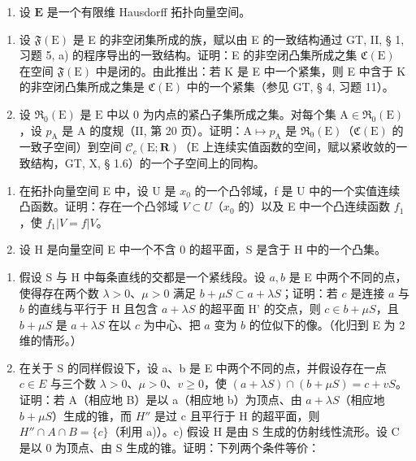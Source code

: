 \begin{enumerate}
\def\labelenumi{\arabic{enumi})}
\setcounter{enumi}{38}
\tightlist
\item
  设 \(\mathbf{E}\) 是一个有限维 Hausdorff 拓扑向量空间。
\end{enumerate}

\begin{enumerate}
\def\labelenumi{\alph{enumi})}
\item
  设 \(\mathfrak{F}(\mathrm{E})\) 是 E 的非空闭集所成的族，赋以由 E 的一致结构通过 GT, II, § 1, 习题 5, a) 的程序导出的一致结构。证明：E 的非空闭凸集所成之集 \(\mathfrak{C}(\mathrm{E})\) 在空间 \(\mathfrak{F}(\mathrm{E})\) 中是闭的。由此推出：若 K 是 E 中一个紧集，则 E 中含于 K 的非空闭凸集所成之集是 \(\mathfrak{C}(\mathrm{E})\) 中的一个紧集（参见 GT, § 4, 习题 11）。
\item
  设 \(\mathfrak{R}_0(\mathrm{E})\) 是 \(\mathrm{E}\) 中以 0 为内点的紧凸子集所成之集。对每个集 \(\mathrm{A} \in \mathfrak{R}_0(\mathrm{E})\)，设 \(p_{\mathrm{A}}\) 是 \(\mathrm{A}\) 的度规（II, 第 20 页）。证明：\(\mathrm{A} \mapsto p_{\mathrm{A}}\) 是 \(\mathfrak{R}_0(\mathrm{E})\)（\(\mathfrak{C}(\mathrm{E})\) 的一致子空间）到空间 \(\mathcal{C}_{c}(\mathrm{E};\mathbf{R})\)（\(\mathrm{E}\) 上连续实值函数的空间，赋以紧收敛的一致结构，GT, X, § 1.6）的一个子空间上的同构。
\end{enumerate}

\begin{enumerate}
\def\labelenumi{\arabic{enumi})}
\setcounter{enumi}{39}
\item
  在拓扑向量空间 E 中，设 U 是 \(x_{0}\) 的一个凸邻域，f 是 U 中的一个实值连续凸函数。证明：存在一个凸邻域 \(V \subset U\)（\(x_{0}\) 的）以及 E 中一个凸连续函数 \(f_{1}\)，使 \(f_{1}|V = f|V\)。
\item
  设 H 是向量空间 E 中一个不含 0 的超平面，S 是含于 H 中的一个凸集。
\end{enumerate}

\begin{enumerate}
\def\labelenumi{\alph{enumi})}
\item
  假设 S 与 H 中每条直线的交都是一个紧线段。设 \(a, b\) 是 E 中两个不同的点，使得存在两个数 \(\lambda > 0\)、\(\mu > 0\) 满足 \(b + \mu S \subset a + \lambda S\)；证明：若 \(c\) 是连接 \(a\) 与 \(b\) 的直线与平行于 H 且包含 \(a + \lambda S\) 的超平面 H' 的交点，则 \(c \in b + \mu S\)，且 \(b + \mu S\) 是 \(a + \lambda S\) 在以 \(c\) 为中心、把 \(a\) 变为 \(b\) 的位似下的像。（化归到 E 为 2 维的情形。）
\item
  在关于 S 的同样假设下，设 a、b 是 E 中两个不同的点，并假设存在一点 \(c \in E\) 与三个数 \(\lambda > 0\)、\(\mu > 0\)、\(v \geqslant 0\)，使 \((a + \lambda S) \cap (b + \mu S) = c + vS\)。证明：若 A（相应地 B）是以 a（相应地 b）为顶点、由 \(a + \lambda S\)（相应地 \(b + \mu S\)）生成的锥，而 \(H''\) 是过 c 且平行于 H 的超平面，则 \(H'' \cap A \cap B = \{c\}\)（利用 a)）。c) 假设 H 是由 S 生成的仿射线性流形。设 C 是以 0 为顶点、由 S 生成的锥。证明：下列两个条件等价：
\end{enumerate}

